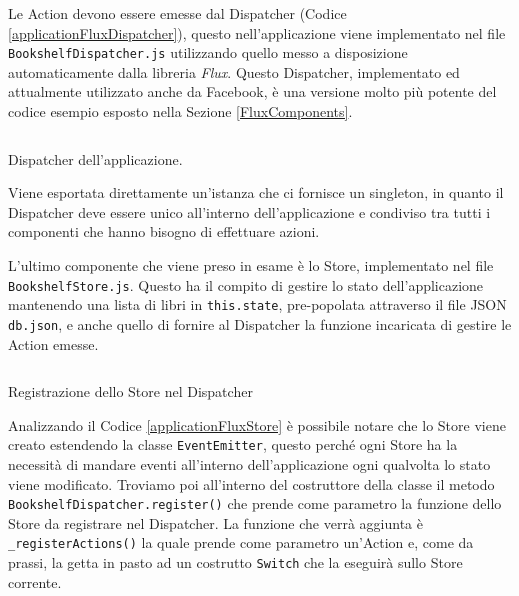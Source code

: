 Le Action devono essere emesse dal Dispatcher (Codice \ref{applicationFluxDispatcher}), questo nell'applicazione viene implementato nel file \texttt{BookshelfDispatcher.js} utilizzando quello messo a disposizione automaticamente dalla libreria \textit{Flux}. Questo Dispatcher, implementato ed attualmente utilizzato anche da Facebook, è una versione molto più potente del codice esempio esposto nella Sezione \ref{FluxComponents}.

\begin{listing}[ht]
\inputminted{jsx}{sources/applicationFluxDispatcher.js}
\caption{Dispatcher dell'applicazione.} 
\label{applicationFluxDispatcher} 
\end{listing} 

Viene esportata direttamente un'istanza che ci fornisce un singleton, in quanto il Dispatcher deve essere unico all'interno dell'applicazione e condiviso tra tutti i componenti che hanno bisogno di effettuare azioni.

L'ultimo componente che viene preso in esame è lo Store, implementato nel file \texttt{BookshelfStore.js}. Questo ha il compito di gestire lo stato dell'applicazione mantenendo una lista di libri in \texttt{this.state}, pre-popolata attraverso il file JSON \texttt{db.json}, e anche quello di fornire al Dispatcher la funzione incaricata di gestire le Action emesse.

\begin{listing}[ht]
\inputminted{jsx}{sources/applicationFluxStore.js}
\caption{Registrazione dello Store nel Dispatcher} 
\label{applicationFluxStore} 
\end{listing}

Analizzando il Codice \ref{applicationFluxStore} è possibile notare che lo Store viene creato estendendo la classe \texttt{EventEmitter}, questo perché ogni Store ha la necessità di mandare eventi all'interno dell'applicazione ogni qualvolta lo stato viene modificato. Troviamo poi all'interno del costruttore della classe il metodo \texttt{BookshelfDispatcher.register()} che prende come parametro la funzione dello Store da registrare nel Dispatcher. La funzione che verrà aggiunta è \texttt{_registerActions()} la quale prende come parametro un'Action e, come da prassi, la getta in pasto ad un costrutto \texttt{Switch} che la eseguirà sullo Store corrente.


